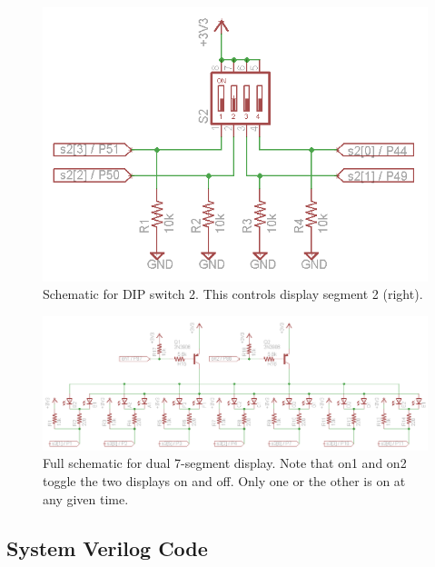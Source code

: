 \documentclass[11pt]{article}
\begin{document}
\begin{figure}[h!]
\centering
\includegraphics[scale=0.54]{s2.png}
\caption{Schematic for DIP switch 2. This controls display segment 2 (right).}
\label{fig:s2_sch}
\end{figure} 


\begin{figure}[h!]
\centering
\includegraphics[scale=0.7, angle=90]{seven_segment_all.png}
\caption{Full schematic for dual 7-segment display. Note that on1 and on2 toggle the two displays on and off. Only one or the other is on at any given time.}
\label{fig:seven_seg_sch}
\end{figure} 


\clearpage
\subsection{System Verilog Code}
\end{document}
